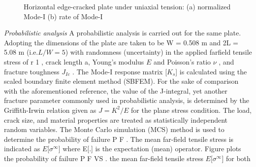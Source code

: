 \documentclass[12pt]{article}
\begin{document}
\begin{figure}[H]
    \centering
    \captionsetup{labelformat=empty}
    \caption{Horizontal edge-cracked plate under uniaxial tension: (a) normalized Mode-I (b) rate of Mode-I}  
\end{figure}
{\it Probabilistic analysis } A probabilistic analysis is carried out for the same plate. Adopting the dimensions of the plate
are taken to be W = 0.508 m  and 2L = 5.08 m  (i.e.$L/W = 5$) with randomness (uncertainty) in the applied farfield
 tensile stress of r 1 , crack length a, Young’s modulus $E$ and Poisson’s ratio $\nu$ , and fracture toughness $J_{Ic}$ . The Mode-I response 
 matrix [$K_s $] is calculated using the scaled boundary finite element method (SBFEM). For the sake of comparison with
the aforementioned reference, the value of the J-integral, yet another fracture parameter commonly used in probabilistic
analysis, is determined by the Griffith-Irwin relation given as $J = K^2 /E$ for the plane stress condition. The load, crack size,
and material properties are treated as statistically independent random variables. The Monte Carlo simulation (MCS)
method is used to determine the probability of failure P F . The mean far-field tensile stress is indicated as $E[\sigma^\infty$] where E[.] is
the expectation (mean) operator. Figure plots the probability of failure P F VS . the mean far-field tensile stress $E[\sigma^\infty$] for both
\end{document}
